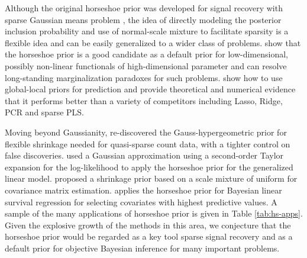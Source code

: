 \documentclass[11pt]{article}
\begin{document}
Although the original horseshoe prior was developed for signal recovery with sparse Gaussian means problem , the idea of directly modeling the posterior inclusion probability and use of normal-scale mixture to facilitate sparsity is a flexible idea and can be easily generalized to a wider class of problems. \citet{bhadra2015default} show that the horseshoe prior is a good candidate as a default prior for low-dimensional, possibly non-linear functionals of high-dimensional parameter and can resolve long-standing marginalization paradoxes for such problems. \citet{bhadra2016prediction} show how to use global-local priors for prediction and provide theoretical and numerical evidence that it performs better than a variety of competitors including Lasso, Ridge, PCR and sparse PLS. 

Moving beyond Gaussianity, \citet{datta2016bayesian} re-discovered the Gauss-hypergeometric prior for flexible shrinkage needed for quasi-sparse count data, with a tighter control on false discoveries. \citet{piironen2016hyperprior} used a Gaussian approximation using a second-order Taylor expansion for the log-likelihood to apply the horseshoe prior for the generalized linear model. \citet{wang2013class} proposed a shrinkage prior based on a scale mixture of uniform for covariance matrix estimation. \citet{peltola2014hierarchical} applies the horseshoe prior for Bayesian linear survival regression for selecting covariates with highest predictive values. A sample of the many applications of horseshoe prior is given in Table \ref{tab:hs-apps}. Given the explosive growth of the methods in this area, we conjecture that the horseshoe prior would be regarded as a key tool sparse signal recovery and as a default prior for objective Bayesian inference for many important problems. 
\end{document}
